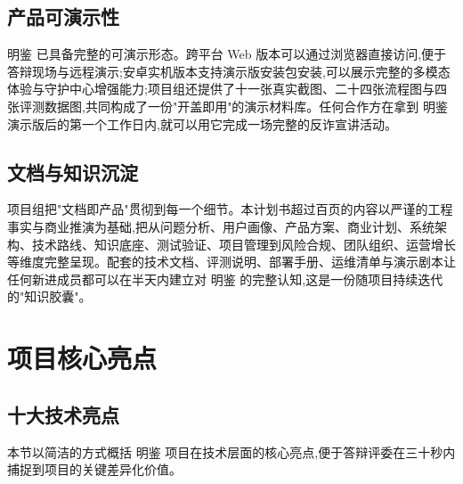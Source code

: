 \documentclass[UTF8,a4paper,12pt]{ctexart}
\begin{document}
\subsection{产品可演示性}

明鉴 已具备完整的可演示形态。跨平台 Web 版本可以通过浏览器直接访问,便于答辩现场与远程演示;安卓实机版本支持演示版安装包安装,可以展示完整的多模态体验与守护中心增强能力;项目组还提供了十一张真实截图、二十四张流程图与四张评测数据图,共同构成了一份"开盖即用"的演示材料库。任何合作方在拿到 明鉴 演示版后的第一个工作日内,就可以用它完成一场完整的反诈宣讲活动。

\subsection{文档与知识沉淀}

项目组把"文档即产品"贯彻到每一个细节。本计划书超过百页的内容以严谨的工程事实与商业推演为基础,把从问题分析、用户画像、产品方案、商业计划、系统架构、技术路线、知识底座、测试验证、项目管理到风险合规、团队组织、运营增长等维度完整呈现。配套的技术文档、评测说明、部署手册、运维清单与演示剧本让任何新进成员都可以在半天内建立对 明鉴 的完整认知,这是一份随项目持续迭代的"知识胶囊"。

\section{项目核心亮点}

\subsection{十大技术亮点}

本节以简洁的方式概括 明鉴 项目在技术层面的核心亮点,便于答辩评委在三十秒内捕捉到项目的关键差异化价值。
\end{document}
